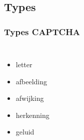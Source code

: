 \documentclass{beamer}
\begin{document}
\subsection{Types}
\begin{frame}
\frametitle{Types CAPTCHA}
   \begin{columns}[c]
       \begin{itemize}
  	     \item<+-> letter
  	     \item<+-> afbeelding
  	     \item<+-> afwijking
  	     \item<+-> herkenning
  	     \item<+-> geluid
       \end{itemize}
       \begin{center}

\end{center}
\end{columns}
\end{frame}
\end{document}
